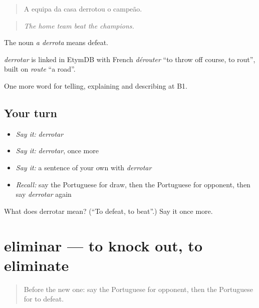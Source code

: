 \begin{quote}
A equipa da casa derrotou o campeão.
\end{quote}

\begin{quote}
\emph{The home team beat the champions.}
\end{quote}

The noun \emph{a derrota} means defeat.

\begin{cousinweb}
\emph{derrotar} is linked in EtymDB with French \emph{dérouter} \textquotedblleft{}to throw off course, to rout\textquotedblright{}, built on \emph{route} \textquotedblleft{}a road\textquotedblright{}.
\end{cousinweb}

\begin{grammarlens}[title={What you've built}]
One more word for telling, explaining and describing at B1.
\end{grammarlens}

\subsection*{Your turn}
\begin{itemize}
\raggedright
  \item \emph{Say it:} \emph{derrotar}
  \item \emph{Say it:} \emph{derrotar}, once more
  \item \emph{Say it:} a sentence of your own with \emph{derrotar}
  \item \emph{Recall:} say the Portuguese for draw, then the Portuguese for opponent, then say \emph{derrotar} again
\end{itemize}

\begin{tcolorbox}[breakable,colback=teal!4,colframe=teal!35!black,title={Before you move on}]
What does derrotar mean? (\textquotedblleft{}To defeat, to beat\textquotedblright{}.) Say it once more.
\end{tcolorbox}
\section[eliminar]{eliminar — to knock out, to eliminate}

\label{lesson:PT-C510-eliminar}



\begin{quote}
Before the new one: say the Portuguese for opponent, then the Portuguese for to defeat.
\end{quote}

